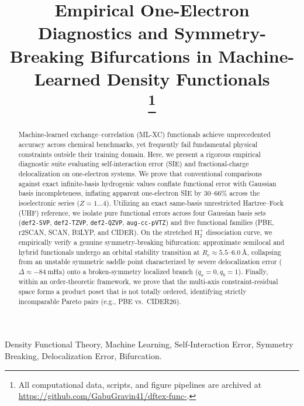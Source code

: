 \documentclass[conference]{IEEEtran}
\begin{document}
\title{Empirical One-Electron Diagnostics and Symmetry-Breaking Bifurcations in Machine-Learned Density Functionals\\
\thanks{All computational data, scripts, and figure pipelines are archived at \protect\url{https://github.com/GabuGravin41/dftex-func-}.}
}

\author{
}

\maketitle

\begin{abstract}
Machine-learned exchange--correlation (ML-XC) functionals achieve unprecedented accuracy across chemical benchmarks, yet frequently fail fundamental physical constraints outside their training domain. Here, we present a rigorous empirical diagnostic suite evaluating self-interaction error (SIE) and fractional-charge delocalization on one-electron systems. We prove that conventional comparisons against exact infinite-basis hydrogenic values conflate functional error with Gaussian basis incompleteness, inflating apparent one-electron SIE by 30--66\% across the isoelectronic series ($Z=1\dots4$). Utilizing an exact same-basis unrestricted Hartree--Fock (UHF) reference, we isolate pure functional errors across four Gaussian basis sets (\texttt{def2-SVP}, \texttt{def2-TZVP}, \texttt{def2-QZVP}, \texttt{aug-cc-pVTZ}) and five functional families (PBE, r2SCAN, SCAN, B3LYP, and CIDER). On the stretched $\text{H}_2^+$ dissociation curve, we empirically verify a genuine symmetry-breaking bifurcation: approximate semilocal and hybrid functionals undergo an orbital stability transition at $R_c \approx 5.5\text{--}6.0\ \text{\AA}$, collapsing from an unstable symmetric saddle point characterized by severe delocalization error ($\Delta \approx -84\ \text{mHa}$) onto a broken-symmetry localized branch ($q_a=0, q_b=1$). Finally, within an order-theoretic framework, we prove that the multi-axis constraint-residual space forms a product poset that is not totally ordered, identifying strictly incomparable Pareto pairs (e.g., PBE vs.\ CIDER26).
\end{abstract}

\begin{IEEEkeywords}
Density Functional Theory, Machine Learning, Self-Interaction Error, Symmetry Breaking, Delocalization Error, Bifurcation.
\end{IEEEkeywords}
\end{document}
